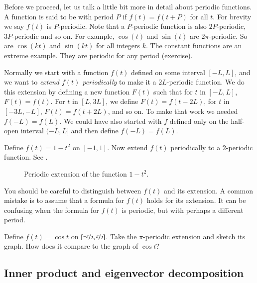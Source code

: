 \documentclass[12pt]{book}
\begin{document}
Before we proceed, let us talk a little bit more in detail about
periodic functions.
A function is said to be \emph{} with period $P$ if
$f(t) = f(t+P)$ for all $t$.  For brevity we say $f(t)$ is $P$-periodic.
Note that a $P$-periodic function is also $2P$-periodic, $3P$-periodic
and so on.
For example, $\cos (t)$ and $\sin (t)$ are
$2\pi$-periodic.  So are $\cos (kt)$ and $\sin (kt)$ for all integers $k$.  The
constant functions are an extreme example.  They are periodic for any period
(exercise).

Normally we start with a function $f(t)$ defined on some interval $[-L,L]$,
and we want to
\emph{extend $f(t)$ periodically}
to make it
a $2L$-periodic function.  We do this extension
by defining a new function $F(t)$
such that for $t$ in $[-L,L]$, $F(t) = f(t)$.  For $t$ in $[L,3L]$,
we define $F(t) = f(t-2L)$, for $t$ in $[-3L,-L]$, $F(t) = f(t+2L)$, and
so on.
To make that work we needed $f(-L) = f(L)$.
We could have also started with $f$
defined only on the half-open interval $(-L,L]$ and then define $f(-L) = f(L)$.

\begin{example}
Define $f(t) = 1-t^2$ on $[-1,1]$.  Now extend $f(t)$ periodically to
a 2-periodic function.  See .
\begin{figure}[h!t]
\capstart
\begin{center}
\caption{Periodic extension of the function
$1-t^2$.\label{ts:perextofinvertedparabolafig}}
\end{center}
\end{figure}
\end{example}

You should be careful to distinguish between $f(t)$ and its extension.  A common
mistake is to assume that a formula for $f(t)$ holds for its extension.  It
can be confusing when the formula for $f(t)$ is periodic, but with perhaps
a different period.

\begin{exercise}
Define $f(t) = \cos t$ on $[\nicefrac{-\pi}{2},\nicefrac{\pi}{2}]$.  Take the $\pi$-periodic
extension and sketch its graph.  How does it compare to the graph of
$\cos t$?
\end{exercise}

\subsection{Inner product and eigenvector decomposition}
\end{document}
